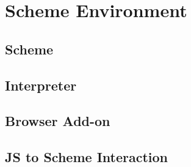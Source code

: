 \chapter{Scheme Environment}


\section{Scheme} 

\section{Interpreter}
\section{Browser Add-on}


\section{JS to Scheme Interaction}

